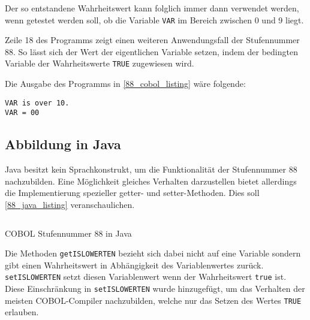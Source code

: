 Der so entstandene Wahrheitswert kann folglich immer dann verwendet werden, wenn getestet werden soll, ob die Variable \texttt{VAR} im Bereich zwischen 0 und 9 liegt.

Zeile 18 des Programms zeigt einen weiteren Anwendungsfall der Stufennummer 88. So lässt sich der Wert der eigentlichen Variable setzen, indem der bedingten Variable der Wahrheitswerte \texttt{TRUE} zugewiesen wird.

Die Ausgabe des Programms in \autoref{88_cobol_listing} wäre folgende:
\begin{verbatim}
VAR is over 10.
VAR = 00
\end{verbatim}

\subsection*{Abbildung in Java}
Java besitzt kein Sprachkonstrukt, um die Funktionalität der Stufennummer 88 nachzubilden. Eine Möglichkeit gleiches Verhalten darzustellen bietet allerdings die Implementierung spezieller getter- und setter-Methoden. Dies soll \autoref{88_java_listing} veranschaulichen.

\begin{listing}[H]
  \inputminted[bgcolor=mintedgrey,xleftmargin=20pt,linenos,fontsize=\footnotesize]{java}{code/88_section.java.txt}
  \caption{COBOL Stufennummer 88 in Java}
  \label{88_java_listing}
\end{listing} 

Die Methoden \texttt{getISLOWERTEN} bezieht sich dabei nicht auf eine Variable sondern gibt einen Wahrheitswert in Abhängigkeit des Variablenwertes zurück. \texttt{setISLOWERTEN} setzt diesen Variablenwert wenn der Wahrheitswert \texttt{true} ist. Diese Einschränkung in \texttt{setISLOWERTEN} wurde hinzugefügt, um das Verhalten der meisten COBOL-Compiler nachzubilden, welche nur das Setzen des Wertes \texttt{TRUE} erlauben.

